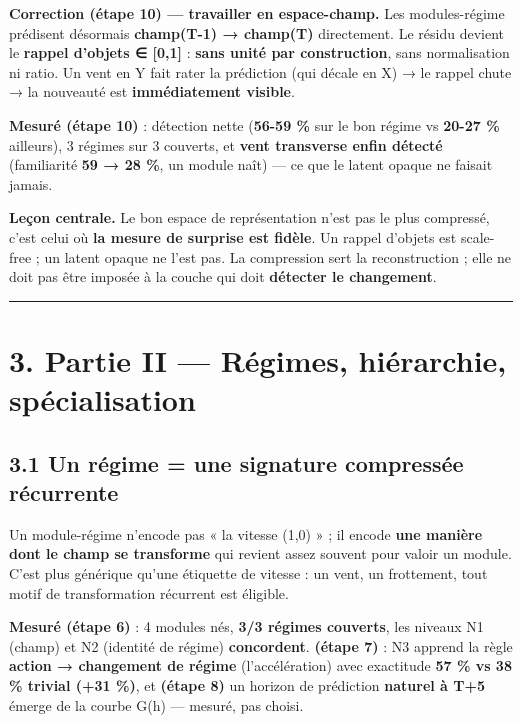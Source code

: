 \documentclass[
  french,
  11pt,
]{article}
\begin{document}
\textbf{Correction (étape 10) --- travailler en espace-champ.} Les
modules-régime prédisent désormais \textbf{champ(T-1) → champ(T)}
directement. Le résidu devient le \textbf{rappel d'objets ∈ {[}0,1{]}} :
\textbf{sans unité par construction}, sans normalisation ni ratio. Un
vent en Y fait rater la prédiction (qui décale en X) → le rappel chute →
la nouveauté est \textbf{immédiatement visible}.

\textbf{Mesuré (étape 10)} : détection nette (\textbf{56-59 \%} sur le
bon régime vs \textbf{20-27 \%} ailleurs), 3 régimes sur 3 couverts, et
\textbf{vent transverse enfin détecté} (familiarité \textbf{59 → 28 \%},
un module naît) --- ce que le latent opaque ne faisait jamais.

\textbf{Leçon centrale.} Le bon espace de représentation n'est pas le
plus compressé, c'est celui où \textbf{la mesure de surprise est
fidèle}. Un rappel d'objets est scale-free ; un latent opaque ne l'est
pas. La compression sert la reconstruction ; elle ne doit pas être
imposée à la couche qui doit \textbf{détecter le changement}.

\begin{center}\rule{0.5\linewidth}{0.5pt}\end{center}

\section{3. Partie II --- Régimes, hiérarchie,
spécialisation}\label{partie-ii-ruxe9gimes-hiuxe9rarchie-spuxe9cialisation}

\subsection{3.1 Un régime = une signature compressée
récurrente}\label{un-ruxe9gime-une-signature-compressuxe9e-ruxe9currente}

Un module-régime n'encode pas « la vitesse (1,0) » ; il encode
\textbf{une manière dont le champ se transforme} qui revient assez
souvent pour valoir un module. C'est plus générique qu'une étiquette de
vitesse : un vent, un frottement, tout motif de transformation récurrent
est éligible.

\textbf{Mesuré (étape 6)} : 4 modules nés, \textbf{3/3 régimes
couverts}, les niveaux N1 (champ) et N2 (identité de régime)
\textbf{concordent}. \textbf{(étape 7)} : N3 apprend la règle
\textbf{action → changement de régime} (l'accélération) avec exactitude
\textbf{57 \% vs 38 \% trivial (+31 \%)}, et \textbf{(étape 8)} un
horizon de prédiction \textbf{naturel à T+5} émerge de la courbe G(h)
--- mesuré, pas choisi.
\end{document}
